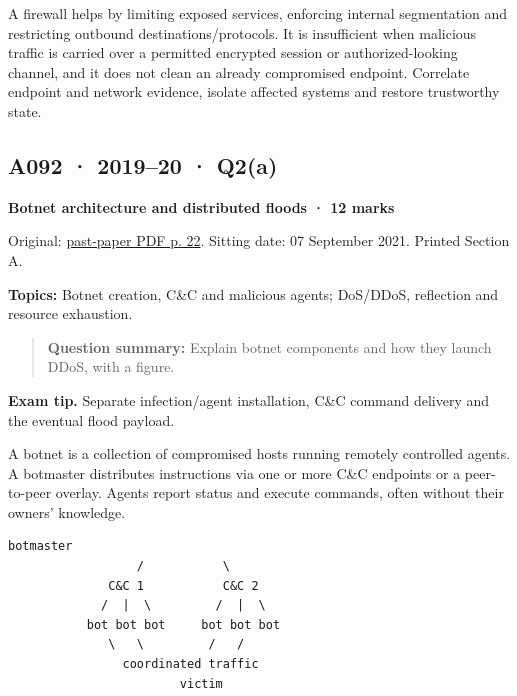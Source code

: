 \documentclass[11pt,a4paper]{article}
\begin{document}
A firewall helps by limiting exposed services,\allowbreak{} enforcing internal segmentation and restricting outbound destinations/\allowbreak{}protocols. It is insufficient when malicious traffic is carried over a permitted encrypted session or authorized-looking channel,\allowbreak{} and it does not clean an already compromised endpoint. Correlate endpoint and network evidence,\allowbreak{} isolate affected systems and restore trustworthy state.




\clearpage
\subsection{A092 · 2019–20 · Q2(a)}\label{a092}

\textbf{Botnet architecture and distributed floods · 12 marks}


Original: \href{../../CSE405-Security_Merged.pdf\#page=22}{past-paper PDF p. 22}. Sitting date: 07 September 2021. Printed Section A.


\textbf{Topics:} Botnet creation,\allowbreak{} C\&C and malicious agents; DoS/\allowbreak{}DDoS,\allowbreak{} reflection and resource exhaustion.



\begin{quote}\small

\textbf{Question summary:} Explain botnet components and how they launch DDoS,\allowbreak{} with a figure.



\end{quote}


{\color{ForestGreen}\textbf{Exam tip.} Separate infection/\allowbreak{}agent installation,\allowbreak{} C\&C command delivery and the eventual flood payload.}


A botnet is a collection of compromised hosts running remotely controlled agents. A botmaster distributes instructions via one or more C\&C endpoints or a peer-to-peer overlay. Agents report status and execute commands,\allowbreak{} often without their owners' knowledge.



\begin{Verbatim}[breaklines=true,breakanywhere=true,fontsize=\small,frame=single,rulecolor=\color{PanelBorder}]
                    botmaster
                  /           \
              C&C 1           C&C 2
             /  |  \         /  |  \
           bot bot bot     bot bot bot
              \   \         /   /
                coordinated traffic
                        victim
\end{Verbatim}
\end{document}
